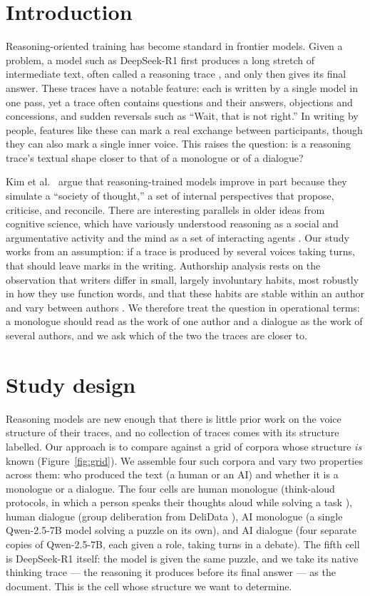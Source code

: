 \documentclass[10pt,twocolumn]{article}
\begin{document}
\section{Introduction}
Reasoning-oriented training has become standard in frontier models. Given a problem, a model such as
DeepSeek-R1 \cite{guo2025} first produces a long stretch of intermediate text, often called a
reasoning trace \cite{kambhampati2025}, and only then gives its final answer. These traces have a
notable feature: each is written by a single model in one pass, yet a trace often contains questions
and their answers, objections and concessions, and sudden reversals such as ``Wait, that is not
right.'' In writing by people, features like these can mark a real exchange between participants,
though they can also mark a single inner voice. This raises the question: is a reasoning trace's
textual shape closer to that of a monologue or of a dialogue?

Kim et al.~\cite{kim2026} argue that reasoning-trained models improve in part because they simulate a
``society of thought,'' a set of internal perspectives that propose, criticise, and reconcile. There
are interesting parallels in older ideas from cognitive science, which have variously understood
reasoning as a social and argumentative activity \cite{mercier2017} and the mind as a set of
interacting agents \cite{minsky1986}. Our study works from an assumption: if a trace is produced by
several voices taking turns, that should leave marks in the writing. Authorship analysis rests on the
observation that writers differ in small, largely involuntary habits, most robustly in how they use
function words, and that these habits are stable within an author and vary between authors
\cite{stamatatos2009}. We therefore treat the question in operational terms: a monologue should read
as the work of one author and a dialogue as the work of several authors, and we ask which of the two
the traces are closer to.

\section{Study design}
Reasoning models are new enough that there is little prior work on the voice structure of their
traces, and no collection of traces comes with its structure labelled. Our approach is to compare
against a grid of corpora whose structure \emph{is} known (Figure~\ref{fig:grid}). We assemble four
such corpora and vary two properties across them: who produced the text (a human or an AI) and whether
it is a monologue or a dialogue. The four cells are human monologue (think-aloud protocols, in which a
person speaks their thoughts aloud while solving a task \cite{wurgaft2025}), human dialogue (group
deliberation from DeliData \cite{karadzhov2023}), AI monologue (a single Qwen-2.5-7B model solving a
puzzle on its own), and AI dialogue (four separate copies of Qwen-2.5-7B, each given a role, taking
turns in a debate). The fifth cell is DeepSeek-R1 itself: the model is given the same puzzle, and we
take its native thinking trace --- the reasoning it produces before its final answer --- as the
document. This is the cell whose structure we want to determine.
\end{document}
